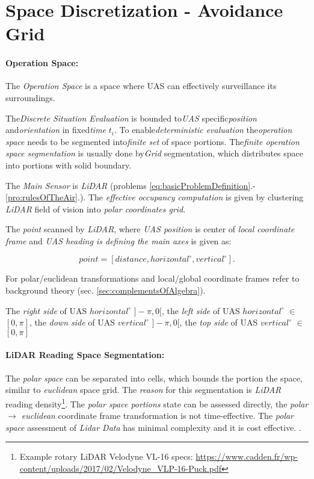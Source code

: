 \cleardoublepage
\section{Space Discretization - Avoidance Grid}\label{s:AvoidanceGrid}

\paragraph{Operation Space:} The \emph{Operation Space} is a space where UAS can effectively surveillance its surroundings.

The\emph{Discrete Situation Evaluation} is bounded to\emph{UAS} specific\emph{position} and\emph{orientation} in fixed\emph{time} $t_i$. To enable\emph{deterministic evaluation} the\emph{operation space} needs to be segmented into\emph{finite set} of space portions. The\emph{finite operation space segmentation} is usually done by\emph{Grid} segmentation, which distributes space into portions with solid boundary.

The \emph{Main Sensor} is \emph{LiDAR} (problems \ref{eq:basicProblemDefinition}.-\ref{pro:rulesOfTheAir}.). The \emph{effective occupancy computation} \cite{homm2010efficient} is given by clustering \emph{LiDAR} field of vision into \emph{polar coordinates grid}.

The \emph{point} scanned by \emph{LiDAR}, where \emph{UAS position} is center of \emph{local coordinate frame} and \emph{UAS heading is defining the main axes} is given as:

\begin{equation*}
    point = [distance,horizontal^\circ,vertical^\circ].
\end{equation*}

\begin{note}
    For polar/euclidean transformations and local/global coordinate frames refer to background theory (sec. \ref{sec:complementsOfAlgebra}). 
    
    The \emph{right side} of UAS $horizontal^\circ$ $]-\pi,0[$, the \emph{left side} of UAS $horizontal^\circ$ $\in$ $[0,\pi]$, the \emph{down side} of UAS $vertical^\circ$ $]-\pi,0[$, the \emph{top side} of UAS $vertical^\circ$ $\in$ $[0,\pi]$
\end{note}

\paragraph{LiDAR Reading Space Segmentation:} The \emph{polar space} can be separated into cells, which bounds the portion the space, similar to \emph{euclidean} space grid. The \emph{reason} for this segmentation is \emph{LiDAR} reading density\footnote{Example rotary LiDAR Velodyne VL-16 specs: \url{https://www.cadden.fr/wp-content/uploads/2017/02/Velodyne_VLP-16-Puck.pdf}}. The \emph{polar space portions} state can be assessed directly, the \emph{polar $\to$ euclidean} coordinate frame transformation is not time-effective. The \emph{polar space} assessment of \emph{Lidar Data} has minimal complexity and it is cost effective. \cite{gupta2010comparative}.

